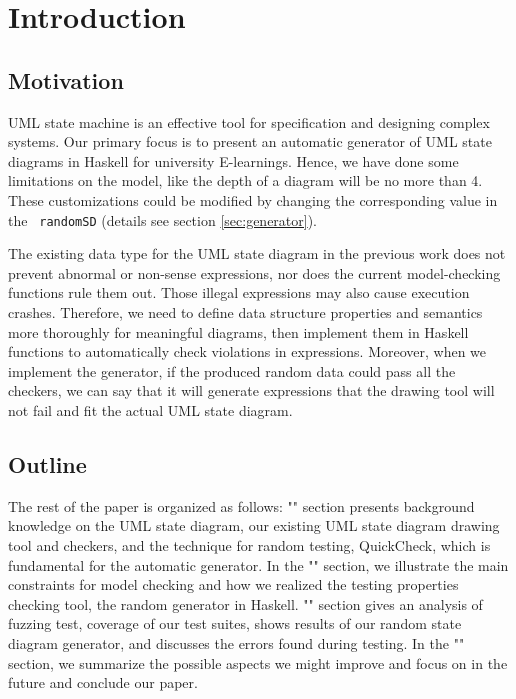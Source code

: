 \chapter{Introduction}
\section{Motivation}
UML state machine is an effective tool for specification and designing complex systems. 
Our primary focus is to present an automatic generator of UML state diagrams in Haskell for university E-learnings.
Hence, we have done some limitations on the model, like the depth of a diagram will be no more than 4. 
These customizations could be modified by changing the corresponding value in the \verb| randomSD| (details see section \ref{sec:generator}).

The existing data type for the UML state diagram in the previous work \cite{jun_hao_tan} does not prevent abnormal or non-sense expressions, nor does the current model-checking functions rule them out. 
Those illegal expressions may also cause execution crashes.
Therefore, we need to define data structure properties and semantics more thoroughly for meaningful diagrams, then implement them in Haskell functions to automatically check violations in expressions.
Moreover, when we implement the generator, if the produced random data could pass all the checkers, we can say that it will generate expressions that the drawing tool will not fail and fit the actual UML state diagram.


\section{Outline}
The rest of the paper is organized as follows: "" section presents background knowledge on the UML state diagram, our existing UML state diagram drawing tool and checkers, and the technique for random testing, QuickCheck, which is fundamental for the automatic generator.
In the "" section, we illustrate the main constraints for model checking and how we realized the testing properties checking tool, the random generator in Haskell.
 "" section gives an analysis of fuzzing test, coverage of our test suites, shows results of our random state diagram generator, and discusses the errors found during testing.
In the "" section, we summarize the possible aspects we might improve and focus on in the future and conclude our paper.